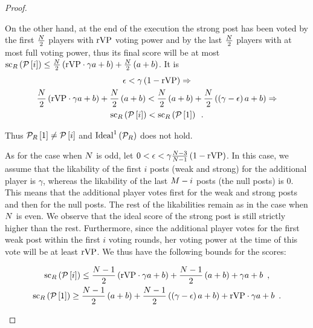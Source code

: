 \begin{proof}
\begin{itemize}
    On the other hand, at the end of the execution the strong post has been
    voted by the first $\frac{N}{2}$ players with $\mathrm{rVP}$
    voting power and by the last $\frac{N}{2}$ players with at most
    full voting power, thus its final score will be at most
    $\mathrm{sc}_{R}\left(\mathcal{P}\left[i\right]\right) \leq
    \frac{N}{2}\left(\mathrm{rVP} \cdot \gamma a + b\right) +
    \frac{N}{2}\left(a + b\right)$. It is
    \begin{gather*}
      \epsilon < \gamma\left(1 - \mathrm{rVP}\right) \Rightarrow \\
      \frac{N}{2}\left(\mathrm{rVP} \cdot \gamma a + b\right) +
      \frac{N}{2}\left(a + b\right) < \frac{N}{2}\left(a +
      b\right) + \frac{N}{2}\left(\left(\gamma - \epsilon\right) a +
      b\right) \Rightarrow \\
      \mathrm{sc}_{R}\left(\mathcal{P}\left[i\right]\right) <
      \mathrm{sc}_{R}\left(\mathcal{P}\left[1\right]\right) \enspace.
    \end{gather*}

    Thus $\mathcal{P}_{R}\left[1\right] \neq \mathcal{P}\left[i\right]$ and
    $\mathrm{Ideal}^1\left(\mathcal{P}_{R}\right)$ does not hold.

    As for the case when $N$ is odd, let $0 < \epsilon <
    \gamma\frac{N - 3}{N - 1}\left(1 - \mathrm{rVP}\right)$. In this
    case, we assume that the likability of the first $i$ posts (weak and strong)
    for the additional player is $\gamma$, whereas the likability of the last
    $M - i$ posts (the null posts) is 0. This means that the additional
    player votes first for the weak and strong posts and then for the null
    posts. The rest of the likabilities remain as in the case when $N$
    is even. We observe that the ideal score of the strong post is still
    strictly higher than the rest. Furthermore, since the additional player
    votes for the first weak post within the first $i$ voting rounds, her voting
    power at the time of this vote will be at least $\mathrm{rVP}$. We thus have the
    following bounds for the scores:

    \begin{gather*}
      \mathrm{sc}_{R}\left(\mathcal{P}\left[i\right]\right) \leq
      \frac{N - 1}{2}\left(\mathrm{rVP} \cdot \gamma a + b\right) +
      \frac{N - 1}{2}\left(a + b\right) + \gamma a + b \enspace, \\
      \mathrm{sc}_{R}\left(\mathcal{P}\left[1\right]\right) \geq
      \frac{N - 1}{2}\left(a + b\right) + \frac{N -
      1}{2}\left(\left(\gamma - \epsilon\right) a + b\right) + \mathrm{rVP} \cdot \gamma
      a + b \enspace.
    \end{gather*}


\end{itemize}
\end{proof}
